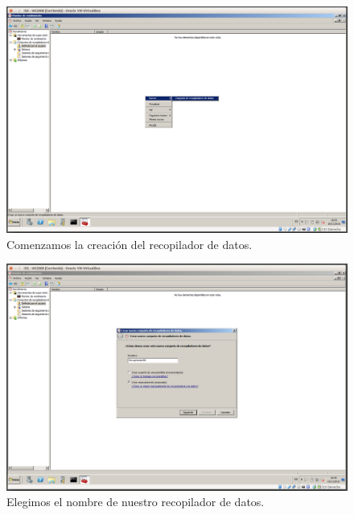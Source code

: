 \documentclass[a4paper,titlepage,12pt]{scrartcl}	%
\numberwithin{figure}{section} %
\numberwithin{table}{section} %
\begin{document}
	\begin{figure}[H]
		\centering
		\includegraphics[scale=0.27]{./Imagenes/5-1.png}
		\caption[Comenzamos la creación del recopilador de datos.]{Comenzamos la creación del recopilador de datos.}
		\label{5-1}
	\end{figure}
	
	\begin{figure}[H]
		\centering
		\includegraphics[scale=0.27]{./Imagenes/5-2.png}
		\caption[Elegimos el nombre de nuestro recopilador de datos.]{Elegimos el nombre de nuestro recopilador de datos.}
		\label{5-2}
	\end{figure}
	
\end{document}
